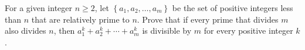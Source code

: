 For a given integer $n\geq2$, let $\left\{a_1,a_2,\ldots,a_m\right\}$ be the set of positive integers less than $n$ that are relatively prime to $n$. Prove that if every prime that divides $m$ also divides $n$, then $a_1^k+a_2^k+\cdots+a_m^k$ is divisible by $m$ for every positive integer $k$.